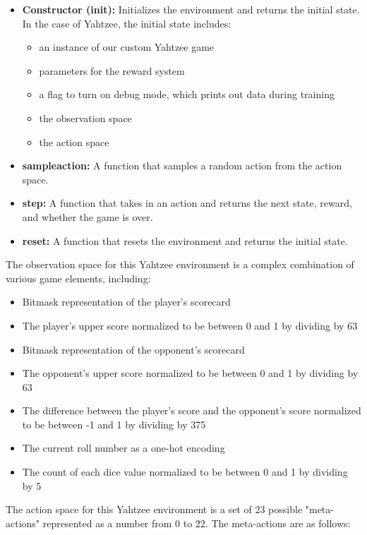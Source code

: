 \documentclass[12pt]{article}
\begin{document}
\begin{itemize}
    \item \textbf{Constructor (init):} Initializes the environment and returns the initial state. In the case of Yahtzee, the initial state includes:
    \begin{itemize}
        \item an instance of our custom Yahtzee game
        \item parameters for the reward system
        \item a flag to turn on debug mode, which prints out data during training
        \item the observation space
        \item the action space
    \end{itemize}
    \item \textbf{sample\textunderscore action:} A function that samples a random action from the action space.
    \item \textbf{step:} A function that takes in an action and returns the next state, reward, and whether the game is over.
    \item \textbf{reset:} A function that resets the environment and returns the initial state.
\end{itemize}

\noindent
The observation space for this Yahtzee environment is a complex combination of various game elements, including:

\begin{itemize}
    \item Bitmask representation of the player's scorecard
    \item The player's upper score normalized to be between 0 and 1 by dividing by 63
    \item Bitmask representation of the opponent's scorecard
    \item The opponent's upper score normalized to be between 0 and 1 by dividing by 63
    \item The difference between the player's score and the opponent's score normalized to be between -1 and 1 by dividing by 375
    \item The current roll number as a one-hot encoding
    \item The count of each dice value normalized to be between 0 and 1 by dividing by 5
\end{itemize}

\noindent
The action space for this Yahtzee environment is a set of 23 possible "meta-actions" represented as a number from 0 to 22. The meta-actions are as follows:
\end{document}

